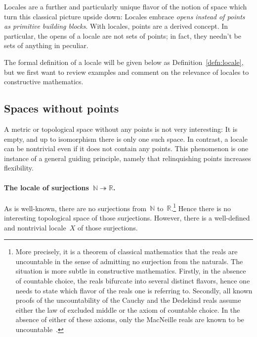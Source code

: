 \documentclass{ws-rv9x6}
\newcommand{\NN}{\mathbb{N}}
\newcommand{\RR}{\mathbb{R}}
\renewcommand{\_}{\mathpunct{.}}
\newcommand{\?}{\,{:}\,}
\begin{document}
Locales are a further and particularly unique flavor of the notion of space
which turn this classical picture upside down: Locales embrace \emph{opens
instead of points as primitive building blocks}. With locales, points are a
derived concept. In particular, the opens of a locale are not sets of points;
in fact, they needn't be sets of anything in peculiar.

The formal definition of a locale will be given below as
Definition~\ref{defn:locale}, but we first want to review examples and comment on
the relevance of locales to constructive mathematics.


\subsection{Spaces without points}
\label{sect:examples-no-points}

A metric or topological space without any points is not very interesting: It is
empty, and up to isomorphism there is only one such space. In contrast, a
locale can be nontrivial even if it does not contain any points. This
phenomenon is one instance of a general guiding principle, namely that relinquishing
points increases flexibility.

\paragraph{The locale of surjections~$\NN \twoheadrightarrow \RR$.} As is
well-known, there are no surjections from~$\NN$ to~$\RR$.\footnote{More
precisely, it is a theorem of classical mathematics that the reals are
uncountable in the sense of admitting no surjection from the naturals. The
situation is more subtle in constructive mathematics. Firstly, in the absence
of countable choice, the reals bifurcate into several distinct flavors, hence
one needs to state which flavor of the reals one is referring to. Secondly, all
known proofs of the uncountability of the Cauchy and the Dedekind reals assume
either the law of excluded middle or the axiom of countable choice. In the
absence of either of these axioms, only the MacNeille reals are known to be
uncountable~\cite{blechschmidt-hutzler:macneille}.} Hence there is no
interesting topological space of those surjections. However, there is a
well-defined and nontrivial locale~$X$ of those surjections.
\end{document}
